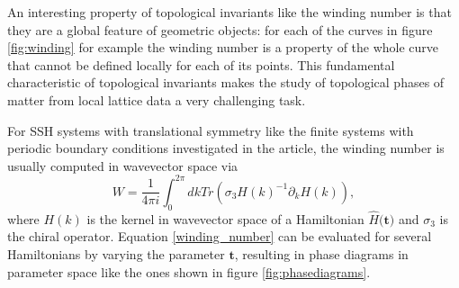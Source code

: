 \documentclass[10pt]{revtex4-1}
\begin{document}
An interesting property of topological invariants like the winding number is that they are a global feature of geometric objects: for each of the curves in figure \ref{fig:winding} for example the winding number is a property of the whole curve that cannot be defined locally for each of its points. This fundamental characteristic of topological invariants makes the study of topological phases of matter from local lattice data a very challenging task.   

For SSH systems with translational symmetry like the finite systems with periodic boundary conditions investigated in the article, the winding number is usually computed in wavevector space via
\begin{equation}\label{winding_number}
W=\frac{1}{4\pi i}\int_0^{2\pi} dk Tr( \sigma_3 H(k)^{-1} \partial_k H(k)),
\end{equation}
where $H(k)$ is the kernel in wavevector space of a Hamiltonian $\hat{H}$$($$\mathbf{t}$$)$ and $\sigma_3$ is the chiral operator. Equation \eqref{winding_number} can be evaluated for several Hamiltonians by varying the parameter $\mathbf{t}$, resulting in phase diagrams in parameter space like the ones shown in figure \ref{fig:phasediagrams}.
\end{document}
